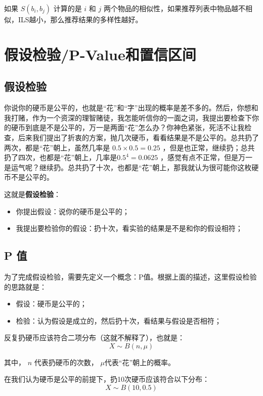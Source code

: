 \documentclass[12pt]{article}
\begin{document}
如果 $S(b_i,b_j)$ 计算的是 $i$ 和 $j$ 两个物品的相似性，如果推荐列表中物品越不相似，ILS越小，那么推荐结果的多样性越好。




\section{假设检验/P-Value和置信区间\cite{P_Value_In_Statistics_Hypothesis}\cite{How_To_Understand_95_Confidential}}
\subsection{假设检验}
你说你的硬币是公平的，也就是“花”和“字”出现的概率是差不多的。然后，你想和我打赌，作为一个资深的理智赌徒，我怎能听信你的一面之词，我提出要检查下你的硬币到底是不是公平的，万一是两面“花”怎么办？你神色紧张，死活不让我检查，后来我们提出了折衷的方案，抛几次硬币，看看结果是不是公平的。总共扔了两次，都是“花”朝上，虽然几率是 $0.5 \times 0.5 = 0.25$ ，但是也正常，继续扔；总共扔了四次，也都是“花”朝上，几率是$0.5^4 = 0.0625$ ，感觉有点不正常，但是万一是运气呢？继续扔。总共扔了十次，也都是“花”朝上，那我就认为很可能你这枚硬币不是公平的。

这就是\textbf{假设检验}：
\begin{itemize}
\setlength{\itemsep}{0pt}
\setlength{\parsep}{0pt}
\setlength{\parskip}{0pt}
    \item 你提出假设：说你的硬币是公平的；
    \item 我提出要检验你的假设：扔十次，看实验的结果是不是和你的假设相符；
\end{itemize}

\subsection{P 值}
为了完成假设检验，需要先定义一个概念：P值。根据上面的描述，这里假设检验的思路就是：
\begin{itemize}
\setlength{\itemsep}{0pt}
\setlength{\parsep}{0pt}
\setlength{\parskip}{0pt}
    \item 假设：硬币是公平的；
    \item 检验：认为假设是成立的，然后扔十次，看结果与假设是否相符；
\end{itemize}

反复扔硬币应该符合二项分布（这就不解释了），也就是：
$$
X \sim B(n, \mu)
$$

其中， $n$ 代表扔硬币的次数， $\mu$代表“花”朝上的概率。

在我们认为硬币是公平的前提下，扔10次硬币应该符合以下分布：
$$
X \sim B(10, 0.5)
$$
\end{document}
